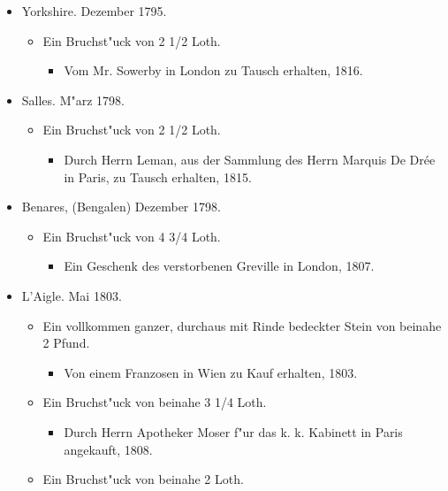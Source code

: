 \documentclass[a4paper, 11pt, oneside, polutonikogreek, german]{article}
\begin{document}
\begin{itemize}
\begin{itemize}
\begin{itemize}
        \end{itemize}
    \end{itemize}
    \item Yorkshire. Dezember 1795.
    \begin{itemize}
        \item Ein Bruchst"uck von 2 1/2 Loth.
        \begin{itemize}
            \item Vom Mr. Sowerby in London zu Tausch erhalten, 1816.
        \end{itemize}
    \end{itemize}
    \item Salles. M"arz 1798.
    \begin{itemize}
        \item Ein Bruchst"uck von 2 1/2 Loth.
        \begin{itemize}
            \item Durch Herrn Leman, aus der Sammlung des Herrn Marquis De Drée in Paris, zu Tausch erhalten, 1815.
        \end{itemize}
    \end{itemize}
    \item Benares, (Bengalen) Dezember 1798.
    \begin{itemize}
        \item Ein Bruchst"uck von 4 3/4 Loth.
        \begin{itemize}
            \item Ein Geschenk des verstorbenen Greville in London, 1807.
        \end{itemize}
    \end{itemize}
    \item L'Aigle. Mai 1803.
    \begin{itemize}
        \item Ein vollkommen ganzer, durchaus mit Rinde bedeckter Stein von beinahe 2 Pfund.
        \begin{itemize}
            \item Von einem Franzosen in Wien zu Kauf erhalten, 1803.
        \end{itemize}
        \item Ein Bruchst"uck von beinahe 3 1/4 Loth.
        \begin{itemize}
            \item Durch Herrn Apotheker Moser f"ur das k. k. Kabinett in Paris angekauft, 1808.
        \end{itemize}
        \item Ein Bruchst"uck von beinahe 2 Loth.

\end{itemize}
\end{itemize}
\end{document}
